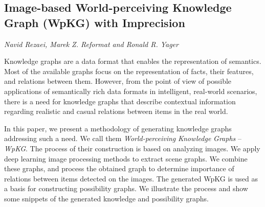\documentclass[../booklet.tex]{subfiles}
\begin{document}
\subsection[Image-based World-perceiving Knowledge Graph (WpKG) with Imprecision. {\it Navid Rezaei, Marek Z. Reformat and Ronald R. Yager}]{Image-based World-perceiving Knowledge Graph (WpKG) with Imprecision}
  

\begin{center}
  {\it Navid Rezaei, Marek Z. Reformat and Ronald R. Yager}
\end{center}

\vskip 0.8cm



Knowledge graphs are a data format that enables the representation of semantics. Most of the available graphs focus on the representation of facts, their features, and relations between them. However, from the point of view of possible applications of semantically rich data formats in intelligent, real-world scenarios, there is a need for knowledge graphs that describe contextual information regarding realistic and casual relations between items in the real world.

In this paper, we present a methodology of generating knowledge graphs addressing such a need. We call them {\em World-perceiving} {\em Knowledge} {\em Gra\-phs} -- {\em WpKG}. The process of their construction is based on analyzing images. We apply deep learning image processing methods to extract scene graphs. We  combine these graphs, and process the obtained graph to determine  importance of relations between items detected on the images. The generated WpKG is used as a basis for constructing possibility graphs. We illustrate the process and show some snippets of the generated knowledge and possibility graphs.


\end{document}
